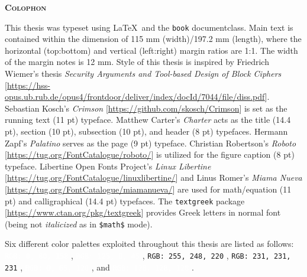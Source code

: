 \pagestyle{empty}

\setcounter{page}{1}
\renewcommand{\thepage}{End-\arabic{page}}

\hfill

\vfill

{

\begin{adjustwidth}{-1mm}{1cm} %
{\noindent \color{sophia} 
\small
\bfseries {} \selectfont \scshape Colophon} \vspace{4mm}
\end{adjustwidth}

\noindent This thesis was typeset using \LaTeX \ and the \texttt{book} documentclass. Main text is contained within the dimension of 115 mm (width)/197.2 mm (length), where the horizontal (top:bottom) and vertical (left:right) margin ratios are 1:1. The width of the margin notes is 12 mm. Style of this thesis is inspired by Friedrich Wiemer's thesis \textit{Security Arguments and Tool-based Design of Block Ciphers} [\url{https://hss-opus.ub.rub.de/opus4/frontdoor/deliver/index/docId/7044/file/diss.pdf}]. \\

\noindent Sebastian Kosch's \textit{Crimson} [\url{https://github.com/skosch/Crimson}] is set as the running text (11 pt) typeface. Matthew Carter’s \textit{Charter} acts as the title (14.4 pt), section (10 pt), subsection (10 pt), and header (8 pt) typefaces. Hermann Zapf's \textit{Palatino} serves as the page (9 pt) typeface. Christian Robertson's \textit{Roboto} [\url{https://tug.org/FontCatalogue/roboto/}] is utilized for the figure caption (8 pt) typeface. Libertine Open Fonts Project's \textit{Linux Libertine} [\url{https://tug.org/FontCatalogue/linuxlibertine/}] and Linus Romer's \textit{Miama Nueva} [\url{https://tug.org/FontCatalogue/miamanueva/}] are used for math/equation (11 pt) and calligraphical (14.4 pt) typefaces. The \texttt{textgreek} package [\url{https://www.ctan.org/pkg/textgreek}] provides Greek letters in normal font (being not \textit{italicized} as in \texttt{\$math\$} mode). \\

\begin{sloppypar}
\noindent Six different color palettes exploited throughout this thesis are listed as follows: \colorbox{ntnu}{\textcolor{White}{\texttt{RGB: 0, 80, 158}}} , \colorbox{sophia}{\textcolor{White}{\texttt{RGB: 125, 0, 45}}} , \colorbox{abstractback}{\texttt{RGB: 255, 248, 220}} , \colorbox{Test}{\texttt{RGB: 231, 231, 231}} , \colorbox{heidelberg}{\textcolor{White}{\texttt{RGB: 0, 65, 120}}} , and \colorbox{Test3}{\textcolor{White}{\texttt{RGB: 128, 128, 128}}} . \\
\end{sloppypar}

}
